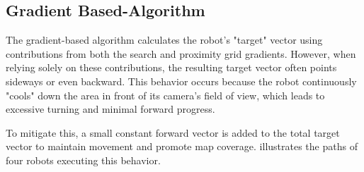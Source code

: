 \subsection{Gradient Based-Algorithm}
The gradient-based algorithm calculates the robot's "target" vector using contributions from both the search and proximity grid gradients. However, when relying solely on these contributions, the resulting target vector often points sideways or even backward. This behavior occurs because the robot continuously "cools" down the area in front of its camera's field of view, which leads to excessive turning and minimal forward progress.

To mitigate this, a small constant forward vector is added to the total target vector to maintain movement and promote map coverage.  illustrates the paths of four robots executing this behavior.

